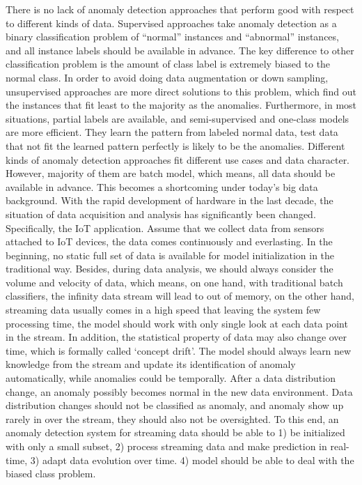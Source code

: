 There is no lack of anomaly detection approaches that perform good with respect to different kinds of data. Supervised approaches take anomaly detection as a binary classification problem of “normal” instances and “abnormal” instances, and all instance labels should be available in advance. The key difference to other classification problem is the amount of class label is extremely biased to the normal class. In order to avoid doing data augmentation or down sampling, unsupervised approaches are more direct solutions to this problem, which find out the instances that fit least to the majority as the anomalies. Furthermore, in most situations, partial labels are available, and semi-supervised and one-class models are more efficient. They learn the pattern from labeled normal data, test data that not fit the learned pattern perfectly is likely to be the anomalies. Different kinds of anomaly detection approaches fit different use cases and data character. However, majority of them are batch model, which means, all data should be available in advance. This becomes a shortcoming under today’s big data background. With the rapid development of hardware in the last decade, the situation of data acquisition and analysis has significantly been changed. Specifically, the IoT application. Assume that we collect data from sensors attached to IoT devices, the data comes continuously and everlasting. In the beginning, no static full set of data is available for model initialization in the traditional way. Besides, during data analysis, we should always consider the volume and velocity of data, which means, on one hand, with traditional batch classifiers, the infinity data stream will lead to out of memory, on the other hand, streaming data usually comes in a high speed that leaving the system few processing time, the model should work with only single look at each data point in the stream. In addition, the statistical property of data may also change over time, which is formally called ‘concept drift’. The model should always learn new knowledge from the stream and update its identification of anomaly automatically, while anomalies could be temporally. After a data distribution change, an anomaly possibly becomes normal in the new data environment. Data distribution changes should not be classified as anomaly, and anomaly show up rarely in over the stream, they should also not be oversighted. To this end, an anomaly detection system for streaming data should be able to 1) be initialized with only a small subset, 2) process streaming data and make prediction in real-time, 3) adapt data evolution over time. 4) model should be able to deal with the biased class problem.\\


